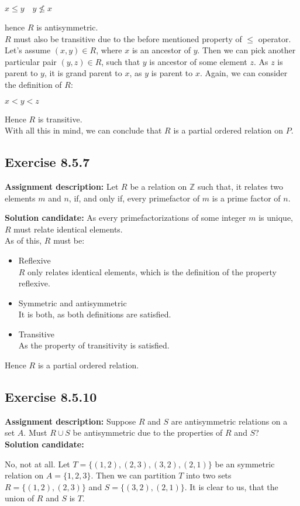 \documentclass{report}
\newcommand{\cent}[1]{\begin{center}#1\end{center}}
\newcommand{\doubleZ}{\mathbb{Z}}
\newcommand{\In}{\! \in \!}
\newcommand{\AssignmentDescription}{\textbf{Assignment description: }}
\newcommand{\Solution}{\textbf{Solution candidate: }}
\newcommand{\QED}{\boxed{}}
\newcommand{\Exercise}[1]{\subsection{Exercise #1}}
\begin{document}
	\cent{$ x \leq y \quad y \not \leq x $}
	
	hence $R$ is antisymmetric.\\
	
	$R$ must also be transitive due to the before mentioned property of $\leq$ operator. Let's assume $(x,y) \In R$, where $x$ is an ancestor of $y$. Then we can pick another particular pair $(y,z)\In R$, such that $y$ is ancestor of some element $z$. As $z$ is parent to $y$, it is grand parent to $x$, as $y$ is parent to $x$. Again, we can consider the definition of $R$:
	
	\cent{$x < y < z$}
	
	Hence $R$ is transitive.\\
	
	With all this in mind, we can conclude that $R$ is a partial ordered relation on $P$.\\
	\QED
	
	\Exercise{8.5.7}
	\AssignmentDescription
	Let $R$ be a relation on $\doubleZ$ such that, it relates two elements $m$ and $n$, if, and only if, every primefactor of $m$ is a prime factor of $n$.
	
	\Solution
	As every primefactorizations of some integer $m$ is unique, $R$ must relate identical elements.\\
	
	As of this, $R$ must be:
	\begin{itemize}
		\item Reflexive\\
		$R$ only relates identical elements, which is the definition of the property reflexive.
		\item Symmetric and antisymmetric\\
		It is both, as both definitions are satisfied.
		\item Transitive\\
		As the property of transitivity is satisfied.
	\end{itemize}
	Hence $R$ is a partial ordered relation.\\
	\QED
 
	\Exercise{8.5.10}
	
	\AssignmentDescription
	Suppose $R$ and $S$ are antisymmetric relations on a set $A$. Must $R \cup S$ be antisymmetric due to the properties of $R$ and $S$?\\
	
	\Solution
	
	No, not at all. Let $T = \{(1,2),(2,3),(3,2),(2,1)\}$ be an symmetric relation on $A = \{1,2,3\}$. Then we can partition $T$ into two sets $R = \{(1,2),(2,3)\}$ and $S = \{(3,2),(2,1)\}$. It is clear to us, that the union of $R$ and $S$ is $T$.\\
	
\end{document}
